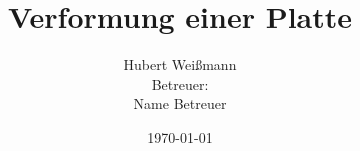 \author{Hubert Wei\ss mann \\ \small{Betreuer:}\\ Name Betreuer}
\date{\today}
\title{Verformung einer Platte}
\maketitle

\tableofcontents





